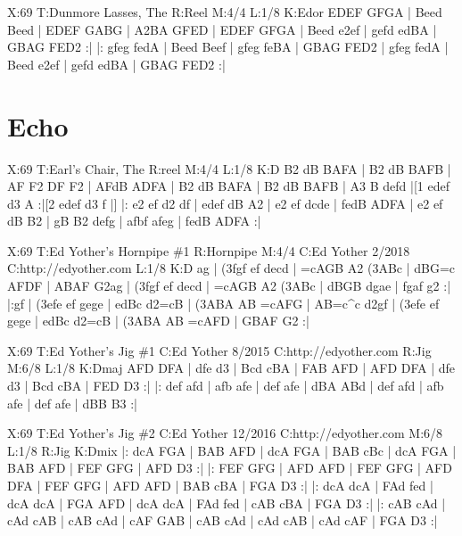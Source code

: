 \documentclass[letterpaper]{article}
\begin{document}
\begin{abc}[name]
X:69
T:Dunmore Lasses, The
R:Reel
M:4/4
L:1/8
K:Edor
EDEF GFGA | Beed Beed | EDEF GABG | A2BA GFED |
EDEF GFGA | Beed e2ef | gefd edBA | GBAG FED2 :|
|: gfeg fedA | Beed Beef | gfeg feBA | GBAG FED2 |
gfeg fedA | Beed e2ef | gefd edBA | GBAG FED2 :|
\end{abc}

\section{Echo}
\begin{abc}[name]
X:69
T:Earl's Chair, The
R:reel
M:4/4
L:1/8
K:D
B2 dB BAFA | B2 dB BAFB | AF F2 DF F2 | AFdB ADFA |
B2 dB BAFA | B2 dB BAFB | A3 B defd |[1 edef d3 A :|[2 edef d3 f |]
|: e2 ef d2 df | edef dB A2 | e2 ef dcde | fedB ADFA |
e2 ef dB B2 | gB B2 defg | afbf afeg | fedB ADFA :|
\end{abc}

\begin{abc}[name]
X:69
T:Ed Yother's Hornpipe \#1
R:Hornpipe
M:4/4
C:Ed Yother 2/2018
C:http://edyother.com
L:1/8
K:D
ag | (3fgf ef decd | =cAGB A2 (3ABc | dBG=c AFDF | ABAF G2ag |
(3fgf ef decd | =cAGB A2 (3ABc | dBGB dgae | fgaf g2 :|
|:gf | (3efe ef gege | edBc d2=cB | (3ABA AB =cAFG | AB=c^c d2gf |
(3efe ef gege | edBc d2=cB | (3ABA AB =cAFD | GBAF G2 :|
\end{abc}

\begin{abc}[name]
X:69
T:Ed Yother's Jig \#1
C:Ed Yother 8/2015
C:http://edyother.com
R:Jig
M:6/8
L:1/8
K:Dmaj
AFD DFA | dfe d3 | Bcd cBA | FAB AFD | 
AFD DFA | dfe d3 | Bcd cBA | FED D3 :|
|: def afd | afb afe | def afe | dBA ABd | 
def afd | afb afe | def afe | dBB B3 :|
\end{abc}

\begin{abc}[name]
X:69
T:Ed Yother's Jig \#2
C:Ed Yother 12/2016
C:http://edyother.com
M:6/8
L:1/8
R:Jig
K:Dmix
|: dcA FGA | BAB AFD | dcA FGA | BAB cBc | 
dcA FGA | BAB AFD | FEF GFG | AFD D3 :|
|: FEF GFG | AFD AFD | FEF GFG | AFD DFA | 
FEF GFG | AFD AFD | BAB cBA | FGA D3 :| 
|: dcA dcA | FAd fed | dcA dcA | FGA AFD | 
dcA dcA | FAd fed | cAB cBA | FGA D3 :|
|: cAB cAd | cAd cAB | cAB cAd | cAF GAB | 
cAB cAd | cAd cAB | cAd cAF | FGA D3 :| 
\end{abc}
\end{document}
